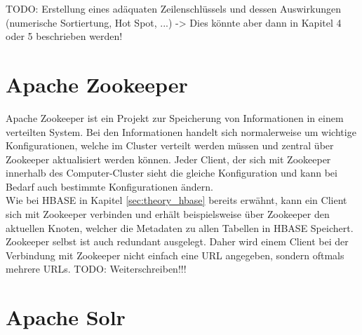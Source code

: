 \noindent
TODO: Erstellung eines adäquaten Zeilenschlüssels und dessen Auswirkungen (numerische Sortiertung, Hot Spot, ...) -> Dies könnte aber dann in Kapitel 4 oder 5 beschrieben werden!


\section{Apache Zookeeper}
\label{sec:theory_zookeeper}
Apache Zookeeper ist ein Projekt zur Speicherung von Informationen in einem verteilten System. Bei den Informationen handelt sich normalerweise um wichtige Konfigurationen, welche im Cluster verteilt werden müssen und zentral über Zookeeper aktualisiert werden können. Jeder Client, der sich mit Zookeeper innerhalb des Computer-Cluster sieht die gleiche Konfiguration und kann bei Bedarf auch bestimmte Konfigurationen ändern.\cite[S. 4 ff]{professional_hadoop}\\
Wie bei HBASE in Kapitel \ref{sec:theory_hbase} bereits erwähnt, kann ein Client sich mit Zookeeper verbinden und erhält beispielsweise über Zookeeper den aktuellen Knoten, welcher die Metadaten zu allen Tabellen in HBASE Speichert.\\

\noindent
Zookeeper selbst ist auch redundant ausgelegt. Daher wird einem Client bei der Verbindung mit Zookeeper nicht einfach eine URL angegeben, sondern oftmals mehrere URLs. TODO: Weiterschreiben!!!


\section{Apache Solr}
\label{sec:theory_solr}
